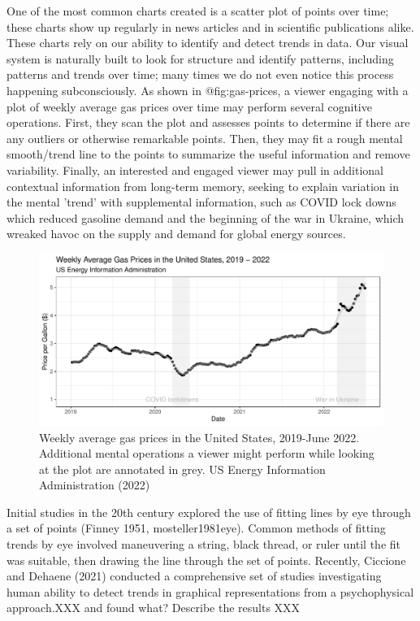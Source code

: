 \documentclass[
  letterpaper,
  DIV=11,
  numbers=noendperiod]{scrartcl}
\newcommand{\svp}[1]{{\textcolor{RedOrange}{#1}}}
\begin{document}
\svp{One of the most common charts created is a scatter plot of points over time; these charts show up regularly in news articles and in scientific publications alike.
These charts rely on our} ability to identify and detect trends in data.
Our visual system is naturally built to look for structure and identify
patterns,
\svp{including patterns and trends over time; many times we do not even notice this process happening subconsciously}.
\svp{As shown in @fig:gas-prices, a viewer engaging with a plot of weekly average gas prices over time may perform several cognitive operations. First, they scan the plot and assesses points to determine if there are any outliers or otherwise remarkable points. Then, they may fit a rough mental smooth/trend line to the points to summarize the useful information and remove variability. Finally, an interested and engaged viewer may pull in additional contextual information from long-term memory, seeking to explain variation in the mental 'trend' with supplemental information, such as COVID lock downs which reduced gasoline demand and the beginning of the war in Ukraine, which wreaked havoc on the supply and demand for global energy sources.}

\begin{figure}

{\centering \includegraphics{./images/gas-prices-1.pdf}

}

\caption{Weekly average gas prices in the United States, 2019-June 2022.
Additional mental operations a viewer might perform while looking at the
plot are annotated in grey. US Energy Information Administration (2022)}

\end{figure}

Initial studies in the 20th century explored the use of fitting lines by
eye through a set of points (Finney 1951, mosteller1981eye). Common
methods of fitting trends by eye involved maneuvering a string, black
thread, or ruler until the fit was suitable, then drawing the line
through the set of points. Recently, Ciccione and Dehaene (2021)
conducted a comprehensive set of studies investigating human ability to
detect trends in graphical representations from a psychophysical
approach.\svp{XXX and found what? Describe the results XXX}
\end{document}
